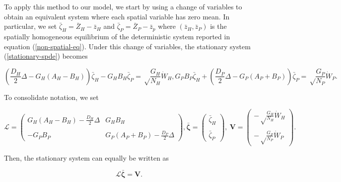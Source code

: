 \documentclass{article}
\begin{document}
To apply this method to our model, we start by using a change of
variables to obtain an equivalent system where each spatial variable has
zero mean. In particular, we set \(\bar\zeta_H=\bar Z_H-\bar z_H\) and
\(\bar\zeta_P=\bar Z_P-\bar z_p\) where \((\bar z_H,\bar z_P)\) is the
spatially homogeneous equilibrium of the deterministic system reported
in equation (\ref{non-spatial-eq}). Under this change of variables, the
stationary system (\ref{stationary-spde}) becomes

\begin{subequations}
  \begin{equation}
    \left(\frac{D_H}{2}\Delta-G_H(A_H-B_H)\right)\bar\zeta_H-G_HB_H\bar\zeta_P=\sqrt\frac{G_H}{N_H}\dot W_H,
  \end{equation}
  \begin{equation}
    G_PB_P\bar \zeta_H+\left(\frac{D_P}{2}\Delta-G_P(A_P+B_P)\right)\bar\zeta_P=\sqrt\frac{G_P}{N_P}\dot W_P.
  \end{equation}
\end{subequations}

To consolidate notation, we set

\begin{subequations}
  \begin{equation}
    \pmb{\mathscr{L}} = \left(\begin{matrix}
      G_H(A_H-B_H)-\frac{D_H}{2}\Delta & G_HB_H \\ & \\
      -G_PB_P & G_P(A_P+B_P)-\frac{D_P}{2}\Delta
    \end{matrix}\right),
  \end{equation}
  \begin{equation}
    \bar{\pmb{\zeta}} = \left(\begin{matrix}
      \bar\zeta_H \\ \\ \bar\zeta_P
    \end{matrix}\right), \ 
    \pmb{V} = \left(\begin{matrix}
      -\sqrt\frac{G_H}{N_H}\dot W_H \\ \\ 
      -\sqrt\frac{G_P}{N_P}\dot W_P
    \end{matrix}\right).
  \end{equation}
\end{subequations}

Then, the stationary system can equally be written as

\begin{equation}
  \pmb{\mathscr{L}}\bar{\pmb\zeta}=\pmb V.
\end{equation}
\end{document}
